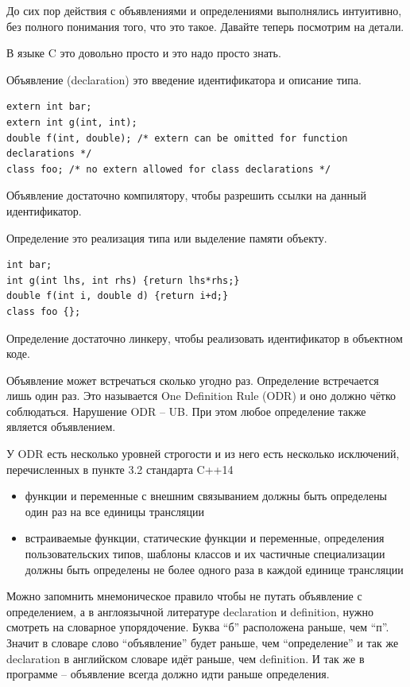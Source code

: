 \documentclass[a4paper,12pt,oneside]{article}
\begin{document}
До сих пор действия с объявлениями и определениями выполнялись интуитивно, без полного понимания того, что это такое. Давайте теперь посмотрим на детали.

В языке C это довольно просто и это надо просто знать.

Объявление (declaration) это введение идентификатора и описание типа.

\begin{lstlisting}
extern int bar;
extern int g(int, int);
double f(int, double); /* extern can be omitted for function declarations */
class foo; /* no extern allowed for class declarations */
\end{lstlisting}

Объявление достаточно компилятору, чтобы разрешить ссылки на данный идентификатор. 

Определение это реализация типа или выделение памяти объекту.

\begin{lstlisting}
int bar;
int g(int lhs, int rhs) {return lhs*rhs;}
double f(int i, double d) {return i+d;}
class foo {};
\end{lstlisting}

Определение достаточно линкеру, чтобы реализовать идентификатор в объектном коде. 

Объявление может встречаться сколько угодно раз. Определение встречается лишь один раз. Это называется One Definition Rule (ODR) и оно должно чётко соблюдаться. Нарушение ODR -- UB. При этом любое определение также является объявлением.

У ODR есть несколько уровней строгости и из него есть несколько исключений, перечисленных в пункте 3.2 стандарта C++14
\begin{itemize}
\item функции и переменные с внешним связыванием должны быть определены один раз на все единицы трансляции
\item встраиваемые функции, статические функции и переменные, определения пользовательских типов, шаблоны классов и их частичные специализации должны быть определены не более одного раза в каждой единице трансляции
\end{itemize}

Можно запомнить мнемоническое правило чтобы не путать объявление с определением, а в англоязычной литературе declaration и definition, нужно смотреть на словарное упорядочение.  Буква ``б'' расположена раньше, чем ``п''. Значит в словаре слово ``объявление'' будет раньше, чем ``определение'' и так же declaration в английском словаре идёт раньше, чем definition. И так же в программе – объявление всегда должно идти раньше определения.
\end{document}
